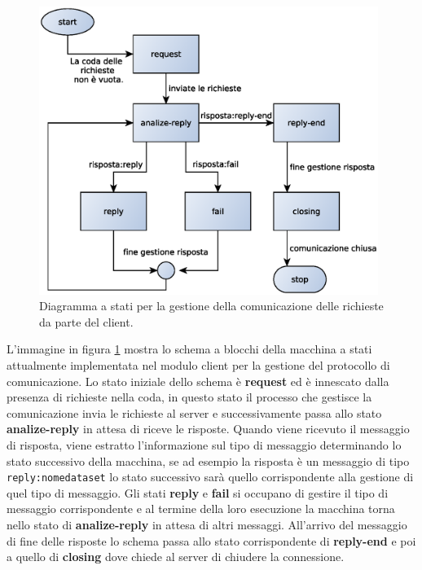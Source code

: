 \begin{figure}
\begin{center}
\includegraphics[width=11cm]{Immagini/StateMachineClient}
\caption{Diagramma a stati per la gestione della comunicazione delle richieste da parte del client.\label{f:stateclient}} 
\end{center} 
\end{figure}

L'immagine in figura \ref{f:stateclient} mostra lo schema a blocchi della macchina a stati attualmente implementata nel modulo client per la gestione del protocollo di comunicazione. Lo stato iniziale dello schema \`e \textbf{request} ed \`e innescato dalla presenza di richieste nella coda, in questo stato il processo che gestisce la comunicazione invia le richieste al server e successivamente passa allo stato \textbf{analize-reply} in attesa di riceve le risposte.
Quando viene ricevuto il messaggio di risposta, viene estratto l'informazione sul tipo di messaggio determinando lo stato successivo della macchina, se ad esempio la risposta \`e un messaggio di tipo \texttt{reply:nomedataset} lo stato successivo sar\`a quello corrispondente alla gestione di quel tipo di messaggio. Gli stati \textbf{reply} e \textbf{fail} si occupano di gestire il tipo di messaggio corrispondente e al termine della loro esecuzione la macchina torna nello stato di \textbf{analize-reply} in attesa di altri messaggi. All'arrivo del messaggio di fine delle risposte lo schema passa allo stato corrispondente di \textbf{reply-end} e poi a quello di \textbf{closing} dove chiede al server di chiudere la connessione. 

